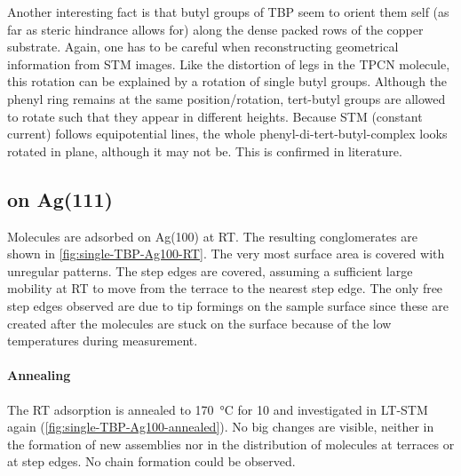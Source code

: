 	Another interesting fact is that butyl groups of TBP seem to orient them self (as far as steric hindrance allows for) along the dense packed rows of the copper substrate. Again, one has to be careful when reconstructing geometrical information from STM images. Like the distortion of legs in the TPCN molecule, this rotation can be explained by a rotation of single butyl groups. Although the phenyl ring remains at the same position/rotation, tert-butyl groups are allowed to rotate such that they appear in different heights. Because STM (constant current) follows equipotential lines, the whole phenyl-di-tert-butyl-complex looks rotated in plane, although it may not be. This is confirmed in literature\cite{heim_surface-assisted_2010, heim_self-assembly_2010}.
	
	\subsection{on Ag(111)}
	\label{sec:single-TBP-Ag100}
	Molecules are adsorbed on Ag(100) at RT. The resulting conglomerates are shown in \autoref{fig:single-TBP-Ag100-RT}. The very most surface area is covered with unregular patterns. The step edges are covered, assuming a sufficient large mobility at RT to move from the terrace to the nearest step edge. The only free step edges observed are due to tip formings on the sample surface since these are created after the molecules are stuck on the surface because of the low temperatures during measurement.
	\paragraph{Annealing}
	The RT adsorption is annealed to \SI{170}{\celsius} for \SI{10}{\min} and investigated in LT-STM again (\autoref{fig:single-TBP-Ag100-annealed}). No big changes are visible, neither in the formation of new assemblies nor in the distribution of molecules at terraces or at step edges. No chain formation could be observed.
	
